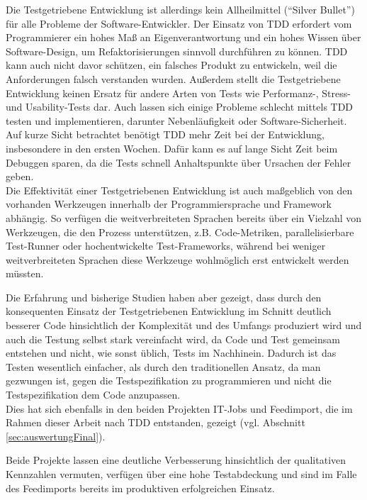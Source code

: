 Die Testgetriebene Entwicklung ist allerdings kein Allheilmittel ("`Silver Bullet"') für alle Probleme der Software-Entwickler. Der Einsatz von TDD erfordert vom Programmierer ein hohes Maß an Eigenverantwortung und ein hohes Wissen über Software-Design, um Refaktorisierungen sinnvoll durchführen zu können. TDD kann auch nicht davor schützen, ein falsches Produkt zu entwickeln, weil die Anforderungen falsch verstanden wurden. Außerdem stellt die Testgetriebene Entwicklung keinen Ersatz für andere Arten von Tests wie Performanz-, Stress- und Usability-Tests dar. Auch lassen sich einige Probleme schlecht mittels TDD testen und implementieren, darunter Nebenläufigkeit oder Software-Sicherheit. Auf kurze Sicht betrachtet benötigt TDD mehr Zeit bei der Entwicklung, insbesondere in den ersten Wochen. Dafür kann es auf lange Sicht Zeit beim Debuggen sparen, da die Tests schnell Anhaltspunkte über Ursachen der Fehler geben.\\
Die Effektivität einer Testgetriebenen Entwicklung ist auch maßgeblich von den vorhanden Werkzeugen innerhalb der Programmiersprache und Framework abhängig. So verfügen die weitverbreiteten Sprachen bereits über ein Vielzahl von Werkzeugen, die den Prozess unterstützen, z.B. Code-Metriken, parallelisierbare Test-Runner oder hochentwickelte Test-Frameworks, während bei weniger weitverbreiteten Sprachen diese Werkzeuge wohlmöglich erst entwickelt werden müssten.

Die Erfahrung und bisherige Studien haben aber gezeigt, dass durch den konsequenten Einsatz der Testgetriebenen Entwicklung im Schnitt deutlich besserer Code hinsichtlich der Komplexität und des Umfangs produziert wird und auch die Testung selbst stark vereinfacht wird, da Code und Test gemeinsam entstehen und nicht, wie sonst üblich, Tests im Nachhinein. Dadurch ist das Testen wesentlich einfacher, als durch den traditionellen Ansatz, da man gezwungen ist, gegen die Testspezifikation zu programmieren und nicht die Testspezifikation dem Code anzupassen.\\
Dies hat sich ebenfalls in den beiden Projekten IT-Jobs und Feedimport, die im Rahmen dieser Arbeit nach TDD entstanden, gezeigt (vgl. Abschnitt \ref{sec:auswertungFinal}).

Beide Projekte lassen eine deutliche Verbesserung hinsichtlich der qualitativen Kennzahlen vermuten, verfügen über eine hohe Testabdeckung und sind im Falle des Feedimports bereits im produktiven erfolgreichen Einsatz.

